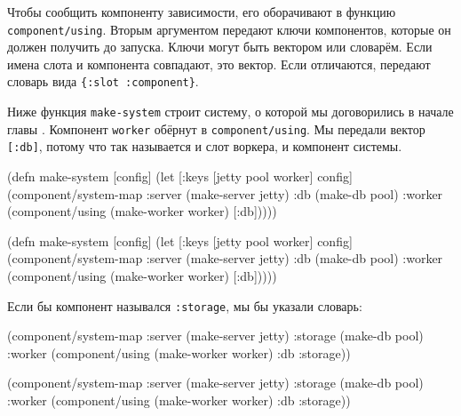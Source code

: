 Чтобы сообщить компоненту зависимости, его оборачивают в функцию
\verb|component/using|. Вторым аргументом передают ключи компонентов, которые он
должен получить до запуска. Ключи могут быть вектором или словарём. Если имена
слота и компонента совпадают, это вектор. Если отличаются, передают словарь вида
\verb|{:slot :component}|.

Ниже функция \verb|make-system| строит систему, о которой мы договорились в
начале главы . Компонент \verb|worker| обёрнут в
\verb|component/using|. Мы передали вектор \verb|[:db]|, потому что так
называется и слот воркера, и компонент системы.

\ifx\DEVICETYPE\MOBILE

\begin{english}
  \begin{clojure}
(defn make-system
  [config]
  (let [{:keys [jetty pool worker]}
        config]
    (component/system-map
     :server (make-server jetty)
     :db     (make-db pool)
     :worker (component/using
               (make-worker worker)
               [:db]))))
  \end{clojure}
\end{english}

\else

\begin{english}
  \begin{clojure}
(defn make-system
  [config]
  (let [{:keys [jetty pool worker]} config]
    (component/system-map
     :server (make-server jetty)
     :db     (make-db pool)
     :worker (component/using
              (make-worker worker) [:db]))))
  \end{clojure}
\end{english}

\fi


\noindent
Если бы компонент назывался \verb|:storage|, мы бы указали словарь:

\ifx\DEVICETYPE\MOBILE

\begin{english}
  \begin{clojure}
(component/system-map
 :server  (make-server jetty)
 :storage (make-db pool)
 :worker  (component/using
            (make-worker worker)
            {:db :storage}))
  \end{clojure}
\end{english}

\else

\begin{english}
  \begin{clojure}
(component/system-map
 :server  (make-server jetty)
 :storage (make-db pool)
 :worker  (component/using
           (make-worker worker) {:db :storage}))
  \end{clojure}
\end{english}

